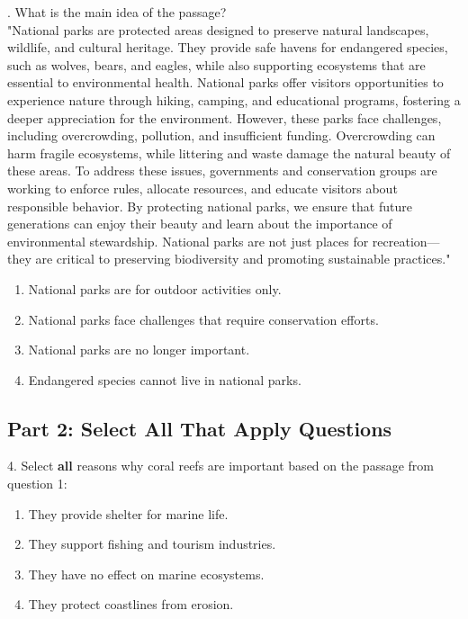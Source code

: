 \documentclass[12pt]{article}
\begin{document}
\vspace{1cm}
. What is the main idea of the passage?\\
"National parks are protected areas designed to preserve natural landscapes, wildlife, and cultural heritage. They provide safe havens for endangered species, such as wolves, bears, and eagles, while also supporting ecosystems that are essential to environmental health. National parks offer visitors opportunities to experience nature through hiking, camping, and educational programs, fostering a deeper appreciation for the environment. However, these parks face challenges, including overcrowding, pollution, and insufficient funding. Overcrowding can harm fragile ecosystems, while littering and waste damage the natural beauty of these areas. To address these issues, governments and conservation groups are working to enforce rules, allocate resources, and educate visitors about responsible behavior. By protecting national parks, we ensure that future generations can enjoy their beauty and learn about the importance of environmental stewardship. National parks are not just places for recreation—they are critical to preserving biodiversity and promoting sustainable practices."\\
\begin{enumerate}[label=\Alph*.]
    \item National parks are for outdoor activities only.  
    \item National parks face challenges that require conservation efforts.  
    \item National parks are no longer important.  
    \item Endangered species cannot live in national parks.  
\end{enumerate}

\vspace{1cm}
\newpage
\subsection*{Part 2: Select All That Apply Questions}

4. Select \textbf{all} reasons why coral reefs are important based on the passage from question 1:\\
\begin{enumerate}[label=\Alph*.]
    \item They provide shelter for marine life.  
    \item They support fishing and tourism industries.  
    \item They have no effect on marine ecosystems.  
    \item They protect coastlines from erosion.  
\end{enumerate}
\end{document}
